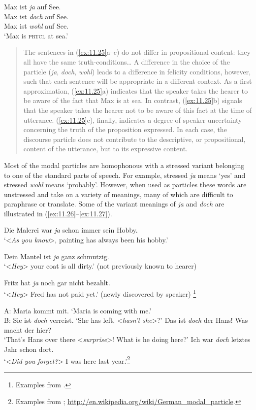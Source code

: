 \ea \label{ex:11.25}
\ea  Max ist \textit{ja} auf See.\\
\ex Max ist \textit{doch} auf See.\\
\ex Max ist \textit{wohl} auf See.\\
‘Max is \textsc{prtcl} at sea.’
\z

\begin{quote}
The sentences in (\ref{ex:11.25}a–c) do not differ in propositional content: they all have the same truth-conditions…  A difference in the choice of the particle (\textit{ja}, \textit{doch}, \textit{wohl}) leads to a difference in felicity conditions, however, such that each sentence will be appropriate in a different context. As a first approximation, (\ref{ex:11.25}a) indicates that the speaker takes the hearer to be aware of the fact that Max is at sea. In contrast, (\ref{ex:11.25}b) signals that the speaker takes the hearer not to be aware of this fact at the time of utterance. (\ref{ex:11.25}c), finally, indicates a degree of speaker uncertainty concerning the truth of the proposition expressed. In each case, the discourse particle does not contribute to the descriptive, or propositional, content of the utterance, but to its expressive content.
\end{quote}
\z


Most of the  modal particles are homophonous with a stressed variant belonging to one of the standard parts of speech. For example, stressed \textit{ja} means ‘yes’ and stressed \textit{wohl} means ‘probably’. However, when used as particles these words are unstressed and take on a variety of meanings, many of which are difficult to paraphrase or translate. Some of the variant meanings of \textit{ja} and \textit{doch} are illustrated in (\ref{ex:11.26}--\ref{ex:11.27}).


\ea \label{ex:11.26}
\ea  Die Malerei war \textit{ja} schon immer sein Hobby.\\
\glt ‘<\textit{As you know}>, painting has always been his hobby.’

\ex  Dein Mantel ist \textit{ja} ganz schmutzig.\\
\glt ‘<\textit{Hey}> your coat is all dirty.’ (not previously known to hearer)

\ex Fritz hat \textit{ja} noch gar nicht bezahlt.\\
\glt ‘<\textit{Hey}> Fred has not paid yet.’ (newly discovered by speaker)
\footnote{Examples from \citealt{König1991,KönigEtAl1990,Waltereit2001}.}
\z \z

\ea \label{ex:11.27} \ea  A: Maria kommt mit. ‘Maria is coming with me.’\\
    B: Sie ist \textit{doch} verreist. ‘She has left, <\textit{hasn’t she}>?’
\ex  Das ist \textit{doch} der Hans! Was macht der hier?\\
‘That’s Hans over there <\textit{surprise}>! What is he doing here?’
\ex Ich war \textit{doch} letztes Jahr schon dort.\\
‘<\textit{Did you forget?}> I was here last year.’\footnote{Examples from \citet{Karagjosova2000,Grosz2010}; \url{http://en.wikipedia.org/wiki/German_modal_particle}.}
\z \z 


